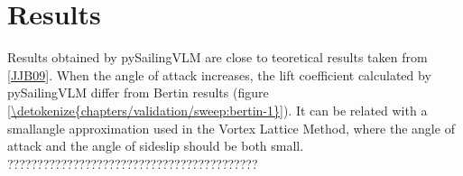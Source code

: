 \documentclass[a4paper,12pt,english]{jupyterBook}
\begin{document}
\part{Results}
\label{\detokenize{chapters/validation/sweep:results}}
\sphinxAtStartPar
Results obtained by pySailingVLM are close to teoretical results taken from {[}\hyperlink{cite.chapters/bibliography:id5}{JJB09}{]}.
When the angle of attack increases, the lift coefficient calculated by pySailingVLM differ from Bertin results (figure \hyperref[\detokenize{chapters/validation/sweep:bertin-1}]{\ref{\detokenize{chapters/validation/sweep:bertin-1}}}). It can be related with a small\sphinxhyphen{}angle approximation used in the Vortex Lattice Method, where the angle of attack and the angle of sideslip should be both small.
??????????????????????????????????????????







\renewcommand{\indexname}{Index}
\printindex
\end{document}
